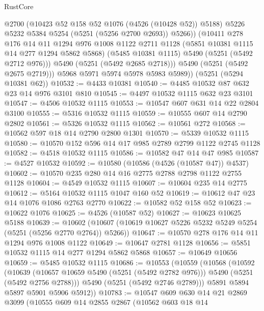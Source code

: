 \begin{lexlean}{RustCore}
\begin{coremodule}
                @2700
                (@10423 @52 @158 @52 @1076 (@4526 (@10428 @52)) @5188)
                @5226
                @5232
                @5384
                @5254
                (@5251 (@5256 @2700 @2693))
                @5266))
            (@10411
              @278
              @176
              @14
              @11
              @1294
              @976
              @1008
              @1122
              @2711
              @1128
              (@5851 @10381 @1115 @14 @277 @1294 @5862 @5868)
              (@5485 @10381 @1115)
              @5490
              (@5251 (@5492 @2712 @976)))
            @5490
            (@5251 (@5492 @2685 @2718)))
          @5490
          (@5251 (@5492 @2675 @2719)))
        @5968
        @5971
        @5974
        @5978
        @5983
        @5989))
    (@5251 (@5294 @10381 @62))
@10532 := @4433 @10381
@10540 := @4485 @10532 @87 @632 @23 @14 @976 @3101 @810
@10545 := @4497 @10532 @1115 @632 @23 @3101
@10547 := @4506 @10532 @1115
@10553 := @10547 @607 @631 @14 @22 @2804 @3100
@10555 := @5316 @10532 @1115
@10559 := @10555 @607 @14 @2790 @2802
@10561 := @5326 @10532 @1115
@10562 := @10561 @272
@10568 := @10562 @597 @18 @14 @2790 @2800 @1301
@10570 := @5339 @10532 @1115
@10580 := @10570 @152 @596 @14 @17 @985 @2789 @2799 @1122 @2745 @1128
@10582 := @4518 @10532 @1115
@10586 := @10582 @47 @14 @47 @985
@10587 := @4527 @10532
@10592 := @10580 (@10586 (@4526 (@10587 @47)) @4537)
@10602 := @10570 @235 @280 @14 @16 @2775 @2788 @2798 @1122 @2755 @1128
@10604 := @4549 @10532 @1115
@10607 := @10604 @235 @14 @2775
@10612 := @5164 @10532 @1115 @1047 @160 @52
@10619 := @10612 @47 @23 @14 @1076 @1086 @2763 @2770
@10622 := @10582 @52 @158 @52
@10623 := @10622 @1076
@10625 := @4526 (@10587 @52)
@10627 := @10623 @10625 @5188
@10639 := @10602 (@10607 (@10619 @10627 @5226 @5232 @5249 @5254 (@5251 (@5256 @2770 @2764)) @5266))
@10647 := @10570 @278 @176 @14 @11 @1294 @976 @1008 @1122
@10649 := @10647 @2781 @1128
@10656 := @5851 @10532 @1115 @14 @277 @1294 @5862 @5868
@10657 := @10649 @10656
@10659 := @5485 @10532 @1115
@10686 := @10553
    (@10559
      (@10568
        (@10592
          (@10639
            (@10657 @10659 @5490 (@5251 (@5492 @2782 @976)))
            @5490
            (@5251 (@5492 @2756 @2788)))
          @5490
          (@5251 (@5492 @2746 @2789)))
        @5891
        @5894
        @5897
        @5901
        @5906
        @5912))
@10783 := @10547
    @609
    @630
    @14
    @21
    @2869
    @3099
    (@10555
      @609
      @14
      @2855
      @2867
      (@10562
        @603
        @18
        @14

\end{coremodule}
\end{lexlean}
